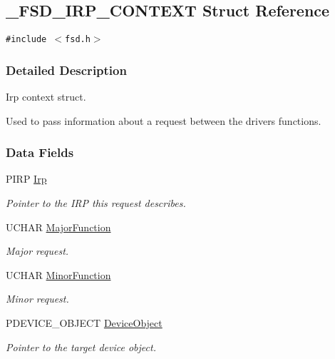 \hypertarget{struct__FSD__IRP__CONTEXT}{
\subsection{\_\-FSD\_\-IRP\_\-CONTEXT Struct Reference}
\label{struct__FSD__IRP__CONTEXT}
}
{\tt \#include $<$fsd.h$>$}



\subsubsection{Detailed Description}
Irp context struct.

Used to pass information about a request between the drivers functions. 

\subsubsection*{Data Fields}
\begin{CompactItemize}
\item 
\hypertarget{struct__FSD__IRP__CONTEXT_m1}{
PIRP \hyperlink{struct__FSD__IRP__CONTEXT_m1}{Irp}}
\label{struct__FSD__IRP__CONTEXT_m1}

\begin{CompactList}\small\item\em Pointer to the IRP this request describes.\item\end{CompactList}\item 
\hypertarget{struct__FSD__IRP__CONTEXT_m2}{
UCHAR \hyperlink{struct__FSD__IRP__CONTEXT_m2}{Major\-Function}}
\label{struct__FSD__IRP__CONTEXT_m2}

\begin{CompactList}\small\item\em Major request.\item\end{CompactList}\item 
\hypertarget{struct__FSD__IRP__CONTEXT_m3}{
UCHAR \hyperlink{struct__FSD__IRP__CONTEXT_m3}{Minor\-Function}}
\label{struct__FSD__IRP__CONTEXT_m3}

\begin{CompactList}\small\item\em Minor request.\item\end{CompactList}\item 
\hypertarget{struct__FSD__IRP__CONTEXT_m4}{
PDEVICE\_\-OBJECT \hyperlink{struct__FSD__IRP__CONTEXT_m4}{Device\-Object}}
\label{struct__FSD__IRP__CONTEXT_m4}

\begin{CompactList}\small\item\em Pointer to the target device object.\item\end{CompactList}\end{CompactItemize}
